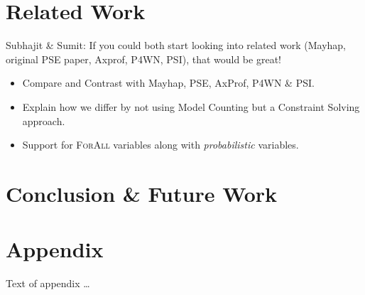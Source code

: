 \documentclass[acmsmall]{acmart}\settopmatter{}
\begin{document}
	\section{Related Work}
	\label{sec:related}
	{\color{red} Subhajit \& Sumit: If you could both start looking into related work (Mayhap, original PSE paper, Axprof, P4WN, PSI), that would be great!}
	\begin{itemize}
		\item Compare and Contrast with Mayhap, PSE, AxProf, P4WN \& PSI.
		\item Explain how we differ by not using Model Counting but a Constraint Solving approach.
		\item Support for \textsc{ForAll} variables along with \textit{probabilistic} variables. 
	\end{itemize}
	\section{Conclusion \& Future Work}
	\label{sec:conclusion}
	
	
	\begin{acks}                            %
	\end{acks}
	
	
	
	
	\appendix
	\section{Appendix}
	
	Text of appendix \ldots
	
\end{document}
